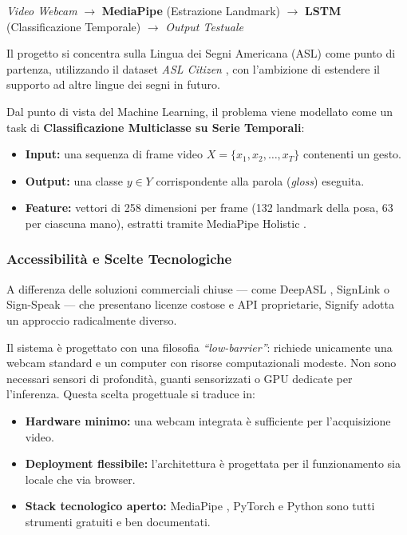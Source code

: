 \begin{center}
    \textit{Video Webcam} $\longrightarrow$ \textbf{MediaPipe} (Estrazione Landmark) $\longrightarrow$ \textbf{LSTM} (Classificazione Temporale) $\longrightarrow$ \textit{Output Testuale}
\end{center}

Il progetto si concentra sulla Lingua dei Segni Americana (ASL) come punto di partenza, utilizzando il dataset \textit{ASL Citizen} \cite{desai2024aslcitizen}, con l'ambizione di estendere il supporto ad altre lingue dei segni in futuro.

Dal punto di vista del Machine Learning, il problema viene modellato come un task di \textbf{Classificazione Multiclasse su Serie Temporali}:
\begin{itemize}
    \item \textbf{Input:} una sequenza di frame video $X = \{x_1, x_2, \dots, x_T\}$ contenenti un gesto.
    \item \textbf{Output:} una classe $y \in Y$ corrispondente alla parola (\textit{gloss}) eseguita.
    \item \textbf{Feature:} vettori di 258 dimensioni per frame (132 landmark della posa, 63 per ciascuna mano), estratti tramite MediaPipe Holistic \cite{mediapipe2020}.
\end{itemize}

\subsubsection{Accessibilità e Scelte Tecnologiche}

A differenza delle soluzioni commerciali chiuse --- come DeepASL \cite{fang2017deepasl}, SignLink o Sign-Speak --- che presentano licenze costose e API proprietarie, Signify adotta un approccio radicalmente diverso.

Il sistema è progettato con una filosofia \textit{``low-barrier''}: richiede unicamente una webcam standard e un computer con risorse computazionali modeste. Non sono necessari sensori di profondità, guanti sensorizzati o GPU dedicate per l'inferenza. Questa scelta progettuale si traduce in:
\begin{itemize}
    \item \textbf{Hardware minimo:} una webcam integrata è sufficiente per l'acquisizione video.
    \item \textbf{Deployment flessibile:} l'architettura è progettata per il funzionamento sia locale che via browser.
    \item \textbf{Stack tecnologico aperto:} MediaPipe \cite{mediapipe2020}, PyTorch e Python sono tutti strumenti gratuiti e ben documentati.
\end{itemize}

